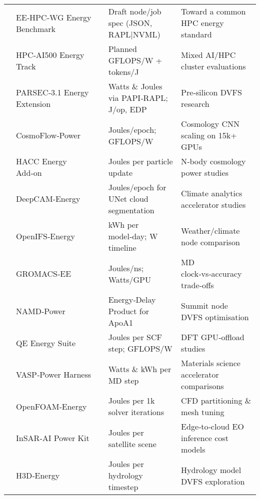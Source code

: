 \begin{table*}[hptb]
\begin{tabularx}{0.25\textwidth}{|p{}p{}p{}|}
   & EE‑HPC‑WG Energy Benchmark  & \cite{eehpcwgenergybe}& Draft node/job spec (JSON, RAPL|NVML) & Toward a common HPC energy standard \\  
   & HPC‑AI500 Energy Track  & \cite{hpcai500energyt}  & Planned GFLOPS/W + tokens/J & Mixed AI/HPC cluster evaluations \\  
   & PARSEC‑3.1 Energy Extension  & \cite{parsec31energye} & Watts \& Joules via PAPI‑RAPL; J/op, EDP & Pre‑silicon DVFS research \\  
   & CosmoFlow‑Power  & \cite{cosmoflow2019}           & Joules/epoch; GFLOPS/W & Cosmology CNN scaling on 15k+ GPUs \\  
   & HACC Energy Add‑on  & \cite{hacc2020power}        & Joules per particle update & N‑body cosmology power studies \\  
   & DeepCAM‑Energy  & \cite{deepcam2020power}         & Joules/epoch for UNet cloud segmentation & Climate analytics accelerator studies \\  
   & OpenIFS‑Energy  & \cite{openifsenergy2023}        & kWh per model‑day; W timeline & Weather/climate node comparison \\  
   & GROMACS‑EE  & \cite{gromacsee2024}                & Joules/ns; Watts/GPU & MD clock‑vs‑accuracy trade‑offs \\  
   & NAMD‑Power  & \cite{namdpower2019}                & Energy‑Delay Product for ApoA1 & Summit node DVFS optimisation \\  
   & QE Energy Suite  & \cite{qeenergy2022}            & Joules per SCF step; GFLOPS/W & DFT GPU‑offload studies \\  
   & VASP‑Power Harness  & \cite{vasppower2023}        & Watts \& kWh per MD step & Materials science accelerator comparisons \\  
   & OpenFOAM‑Energy  & \cite{openfoamenergy2021}      & Joules per 1k solver iterations & CFD partitioning \& mesh tuning \\  
   & InSAR‑AI Power Kit  & \cite{insarpower2024}       & Joules per satellite scene & Edge‑to‑cloud EO inference cost models \\  
   & H3D‑Energy  & \cite{h3denergy2023}                & Joules per hydrology timestep & Hydrology model DVFS exploration \\ \bottomrule
  \end{tabularx}
\end{table*}
